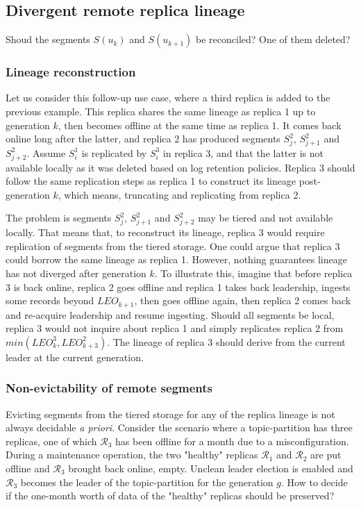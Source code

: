 \documentclass{article}
\begin{document}
\subsection{Divergent remote replica lineage}

Shoud the segments $S(u_k)$ and $S(u_{k+1})$ be reconciled? One of them deleted? 

\subsubsection{Lineage reconstruction}

Let us consider this follow-up use case, where a third replica is added to the previous example. This replica shares the same lineage as replica 1 up to generation $k$, then becomes offline at the same time as replica 1. It comes back online long after the latter, and replica 2 has produced segments $S_j^2$, $S_{j+1}^2$ and $S_{j+2}^2$. Assume $S_i^1$ is replicated by $S_i^3$ in replica 3, and that the latter is not available locally as it was deleted based on log retention policies. Replica 3 should follow the same replication steps as replica 1 to construct its lineage post-generation $k$, which means, truncating and replicating from replica 2.

The problem is segments $S_j^2$, $S_{j+1}^2$ and $S_{j+2}^2$ may be tiered and not available locally. That means that, to reconstruct its lineage, replica 3 would require replication of segments from the tiered storage. One could argue that replica 3 could borrow the same lineage as replica 1. However, nothing guarantees lineage has not diverged after generation $k$. To illustrate this, imagine that before replica 3 is back online, replica 2 goes offline and replica 1 takes back leadership, ingests some records beyond $LEO_{k+1}$, then goes offline again, then replica 2 comes back and re-acquire leadership and resume ingesting. Should all segments be local, replica 3 would not inquire about replica 1 and simply replicates replica 2 from $min(LEO_{k}^3, LEO_{k+3}^2)$. The lineage of replica 3 should derive from the current leader at the current generation.

\subsubsection{Non-evictability of remote segments}

Evicting segments from the tiered storage for any of the replica lineage is not always decidable \textit{a priori}. Consider the scenario where a topic-partition has three replicas, one of which $\mathcal{R}_3$ has been offline for a month due to a misconfiguration. During a maintenance operation, the two "healthy" replicas $\mathcal{R}_1$ and $\mathcal{R}_2$ are put offline and $\mathcal{R}_3$ brought back online, empty. Unclean leader election is enabled and $\mathcal{R}_3$ becomes the leader of the topic-partition for the generation $g$. How to decide if the one-month worth of data of the "healthy" replicas should be preserved?
\end{document}

